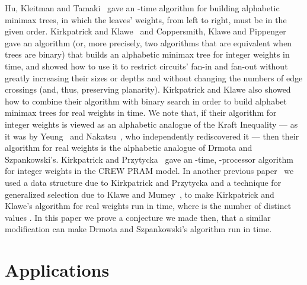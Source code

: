 \documentclass[runningheads]{llncs}
\begin{document}
Hu, Kleitman and Tamaki~\cite{HKT79} gave an -time algorithm for building alphabetic minimax trees, in which the leaves' weights, from left to right, must be in the given order.  Kirkpatrick and Klawe~\cite{KK85} and Coppersmith, Klawe and Pippenger~\cite{CKP86} gave an algorithm (or, more precisely, two algorithms that are equivalent when trees are binary) that builds an alphabetic minimax tree for integer weights in  time, and showed how to use it to restrict circuits' fan-in and fan-out without greatly increasing their sizes or depths and without changing the numbers of edge crossings (and, thus, preserving planarity).  Kirkpatrick and Klawe also showed how to combine their algorithm with binary search in order to build alphabet minimax trees for real weights in  time.  We note that, if their algorithm for integer weights is viewed as an alphabetic analogue of the Kraft Inequality --- as it was by Yeung~\cite{Yeu91} and Nakatsu~\cite{Nak91}, who independently rediscovered it --- then their algorithm for real weights is the alphabetic analogue of Drmota and Szpankowski's.  Kirkpatrick and Przytycka~\cite{KP90} gave an -time, -processor algorithm for integer weights in the CREW PRAM model.  In another previous paper~\cite{Gag??} we used a data structure due to Kirkpatrick and Przytycka and a technique for generalized selection due to Klawe and Mumey~\cite{KM95}, to make Kirkpatrick and Klawe's algorithm for real weights run in  time, where  is the number of distinct values .  In this paper we prove a conjecture we made then, that a similar modification can make Drmota and Szpankowski's algorithm run in  time.

\section{Applications} \label{sec:apps}
\end{document}
